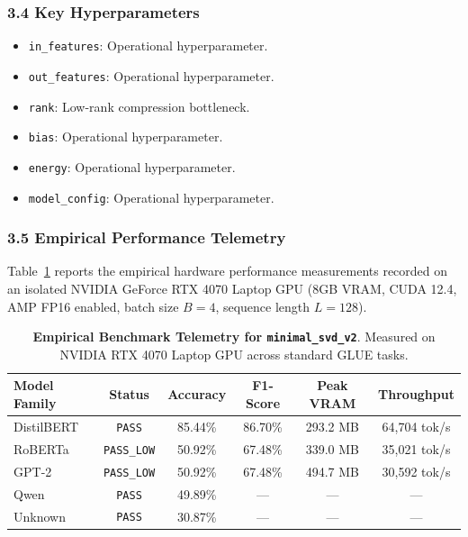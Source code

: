 \subsubsection*{3.4 Key Hyperparameters}
\begin{itemize}
    \item \texttt{in\_features}: Operational hyperparameter.
    \item \texttt{out\_features}: Operational hyperparameter.
    \item \texttt{rank}: Low-rank compression bottleneck.
    \item \texttt{bias}: Operational hyperparameter.
    \item \texttt{energy}: Operational hyperparameter.
    \item \texttt{model\_config}: Operational hyperparameter.
\end{itemize}

\subsubsection*{3.5 Empirical Performance Telemetry}
Table~\ref{tab:telemetry_minimal_svd_v2} reports the empirical hardware performance measurements recorded on an isolated NVIDIA GeForce RTX 4070 Laptop GPU (8GB VRAM, CUDA 12.4, AMP FP16 enabled, batch size $B=4$, sequence length $L=128$).

\begin{table}[h]
\centering
\small
\caption{\textbf{Empirical Benchmark Telemetry for \texttt{minimal\_svd\_v2}}. Measured on NVIDIA RTX 4070 Laptop GPU across standard GLUE tasks.}
\label{tab:telemetry_minimal_svd_v2}
\begin{tabular*}{\columnwidth}{@{\extracolsep{\fill}}lccccc}
\toprule
\textbf{Model Family} & \textbf{Status} & \textbf{Accuracy} & \textbf{F1-Score} & \textbf{Peak VRAM} & \textbf{Throughput} \\
\midrule
DistilBERT & \texttt{PASS} & 85.44\% & 86.70\% & 293.2 MB & 64,704 tok/s \\
RoBERTa & \texttt{PASS\_LOW} & 50.92\% & 67.48\% & 339.0 MB & 35,021 tok/s \\
GPT-2 & \texttt{PASS\_LOW} & 50.92\% & 67.48\% & 494.7 MB & 30,592 tok/s \\
Qwen & \texttt{PASS} & 49.89\% & --- & --- & --- \\
Unknown & \texttt{PASS} & 30.87\% & --- & --- & --- \\
\bottomrule
\end{tabular*}
\end{table}

